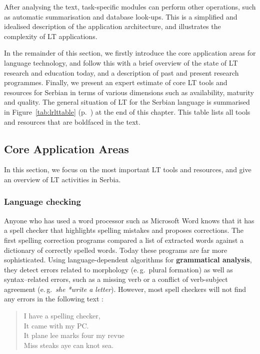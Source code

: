 \begin{multicols}{2}
After analysing the text, task-specific modules can perform other operations, such as automatic summarisation and database look-ups. This is a simplified and idealised description of the application architecture, and illustrates the complexity of LT applications. 

In the remainder of this section, we firstly introduce the core application areas for language technology, and follow this with a brief overview of the state of LT research and education today, and a description of past and present research programmes. Finally, we present an expert estimate of core LT tools and resources for Serbian in terms of various dimensions such as availability, maturity and quality. The general situation of LT for the Serbian language is summarised in
Figure~\ref{tab:lrlttable} (p.~\pageref{tab:lrlttable}) at the end of this chapter. This table lists all tools and
resources that are boldfaced in the text. 
 
 

 \subsection {Core Application Areas}
   
In this section, we focus on the most important LT tools and resources, and give an overview of LT activities in Serbia.   

 \subsubsection {Language checking}
   
 Anyone who has used a word processor such as Microsoft Word knows that it has a spell checker that highlights spelling mistakes and proposes corrections. The first spelling correction programs compared a list of extracted words against a dictionary of correctly spelled words. Today these programs are far more sophisticated. Using language-dependent algorithms for \textbf{grammatical analysis}, they detect errors related to morphology (e.\,g.~plural formation) as well as syntax–related errors, such as a missing verb or a conflict of verb-subject agreement (e.\,g.~\textit{she *write a letter}). However, most spell checkers will not find any errors in the following text \cite{ZAR}:

\begin{quote}
 I have a spelling checker, \\
 It came with my PC. \\
 It plane lee marks four my revue \\
 Miss steaks aye can knot sea. 
\end{quote}


\end{multicols}
